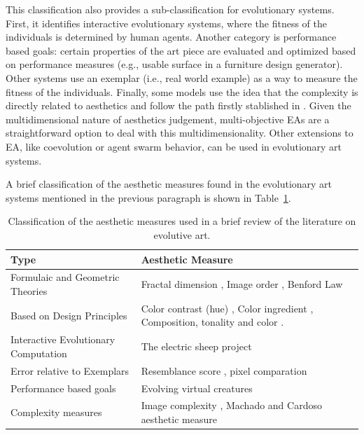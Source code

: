 \documentclass[a4paper,twoside]{article}
\begin{document}
This classification also provides a sub-classification for evolutionary systems. First, it identifies interactive evolutionary systems, where the fitness of the individuals is determined by human agents. Another category is performance based goals: certain properties of the art piece are evaluated and optimized based on performance measures (e.g., usable surface in a furniture design generator). Other systems use an exemplar (i.e., real world example) as a way to measure the fitness of the individuals. Finally, some models use the idea that the complexity is directly related to aesthetics and follow the path firstly stablished in \cite{birkhoff2003aesthetic}.  Given the multidimensional nature of aesthetics judgement, multi-objective EAs are a straightforward option to deal with this multidimensionality. Other extensions to EA, like coevolution or agent swarm behavior, can be used in evolutionary art systems.

A brief classification of the aesthetic measures found in the evolutionary art systems mentioned in the previous paragraph is shown in Table~\ref{table_class}.

\begin{table}[!t] 
\renewcommand{\arraystretch}{1.3} 
\caption{Classification of the aesthetic measures used in a brief review of the literature on evolutive art.} 
\label{table_class} 
\centering
\begin{tabularx}{\textwidth}{|l|X|}
\hline
Type & Aesthetic Measure \\ \hline
Formulaic and Geometric Theories & Fractal dimension \cite{den2010comparing}, Image order \cite{li2012investigating}, Benford Law \cite{del2005benford}\\ \hline
Based on Design Principles &  Color contrast (hue) \cite{den2012evolving},  Color ingredient \cite{li2012investigating}, Composition, tonality and color \cite{dipaola2009incorporating}.\\ \hline
Interactive Evolutionary Computation & The electric sheep project \cite{draves2006electric} \cite{ashlock2006evolutionary,moroni2000vox}\\ \hline
Error relative to Exemplars &  Resemblance score \cite{dipaola2009incorporating}, pixel comparation \cite{aguilar2008robotic}\\ \hline
Performance based goals & Evolving virtual creatures \cite{sims1994evolving} \\\hline
Complexity measures & Image complexity \cite{li2012investigating}, Machado and Cardoso aesthetic measure \cite{machado1998computing}\\ \hline
\end{tabularx}
\end{table}
\end{document}
